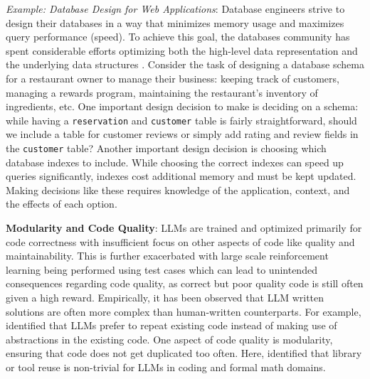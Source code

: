 \begin{tcolorbox}[colback=lightblue, boxrule=0pt, arc=5pt, outer arc=5pt, after skip=10pt plus 2pt]
\textit{Example: Database Design for Web Applications}: Database engineers strive to design their databases in a way that minimizes memory usage and maximizes query performance (speed). To achieve this goal, the databases community has spent considerable efforts optimizing both the high-level data representation and the underlying data structures \citep{kraska2018case, hawkins2011data}. Consider the task of designing a database schema for a restaurant owner to manage their business: keeping track of customers, managing a rewards program, maintaining the restaurant's inventory of ingredients, etc. One important design decision to make is deciding on a schema: while having a \texttt{reservation} and \texttt{customer} table is fairly straightforward, should we include a table for customer reviews or simply add rating and review fields in the \texttt{customer} table? Another important design decision is choosing which database indexes to include. While choosing the correct indexes can speed up queries significantly, indexes cost additional memory and must be kept updated. Making decisions like these requires knowledge of the application, context, and the effects of each option.
\end{tcolorbox}

\textbf{Modularity and Code Quality}: %
LLMs are trained and optimized primarily for code correctness with insufficient focus on other aspects of code like quality and maintainability. This is further exacerbated with large scale reinforcement learning being performed using test cases which can lead to unintended consequences regarding code quality, as correct but poor quality code is still often given a high reward.
Empirically, it has been observed that LLM written solutions are often more complex than human-written counterparts. 
For example, \citet{jain2024r2e} identified that LLMs prefer to repeat existing code instead of making use of abstractions in the existing code. 
One aspect of code quality is modularity, ensuring that code does not get duplicated too often. Here, \citet{berlot2024library} identified that library or tool reuse is non-trivial for LLMs in coding and formal math domains. 

